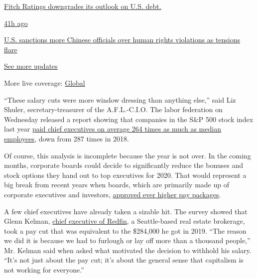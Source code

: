 \href{https://www.nytimes3xbfgragh.onion/live/2020/07/31/business/stock-market-today-coronavirus?action=click\&pgtype=Article\&state=default\&region=MAIN_CONTENT_1\&context=storylines_live_updates\#fitch-ratings-downgrades-its-outlook-on-us-debt}{Fitch
Ratings downgrades its outlook on U.S. debt.}

\href{https://www.nytimes3xbfgragh.onion/live/2020/07/31/business/stock-market-today-coronavirus?action=click\&pgtype=Article\&state=default\&region=MAIN_CONTENT_1\&context=storylines_live_updates\#us-sanctions-more-chinese-officials-over-human-rights-violations-as-tensions-flare}{41h
ago}

\href{https://www.nytimes3xbfgragh.onion/live/2020/07/31/business/stock-market-today-coronavirus?action=click\&pgtype=Article\&state=default\&region=MAIN_CONTENT_1\&context=storylines_live_updates\#us-sanctions-more-chinese-officials-over-human-rights-violations-as-tensions-flare}{U.S.
sanctions more Chinese officials over human rights violations as
tensions flare}

\href{https://www.nytimes3xbfgragh.onion/live/2020/07/31/business/stock-market-today-coronavirus?action=click\&pgtype=Article\&state=default\&region=MAIN_CONTENT_1\&context=storylines_live_updates}{See
more updates}

More live coverage:
\href{https://www.nytimes3xbfgragh.onion/2020/08/01/world/coronavirus-covid-19.html?action=click\&pgtype=Article\&state=default\&region=MAIN_CONTENT_1\&context=storylines_live_updates}{Global}

``These salary cuts were more window dressing than anything else,'' said
Liz Shuler, secretary-treasurer of the A.F.L.-C.I.O. The labor
federation on Wednesday released a report showing that companies in the
S\&P 500 stock index last year \href{https://aflcio.org/paywatch}{paid
chief executives on average 264 times as much as median employees}, down
from 287 times in 2018.

Of course, this analysis is incomplete because the year is not over. In
the coming months, corporate boards could decide to significantly reduce
the bonuses and stock options they hand out to top executives for 2020.
That would represent a big break from recent years when boards, which
are primarily made up of corporate executives and investors,
\href{https://www.nytimes3xbfgragh.onion/2019/05/24/business/highest-paid-ceos-2018.html}{approved
ever higher pay packages}.

A few chief executives have already taken a sizable hit. The survey
showed that Glenn Kelman,
\href{https://www.nytimes3xbfgragh.onion/2016/07/10/technology/a-start-up-shies-away-from-the-gig-economy.html}{chief
executive of Redfin}, a Seattle-based real estate brokerage, took a pay
cut that was equivalent to the \$284,000 he got in 2019. ``The reason we
did it is because we had to furlough or lay off more than a thousand
people,'' Mr. Kelman said when asked what motivated the decision to
withhold his salary. ``It's not just about the pay cut; it's about the
general sense that capitalism is not working for everyone.''

